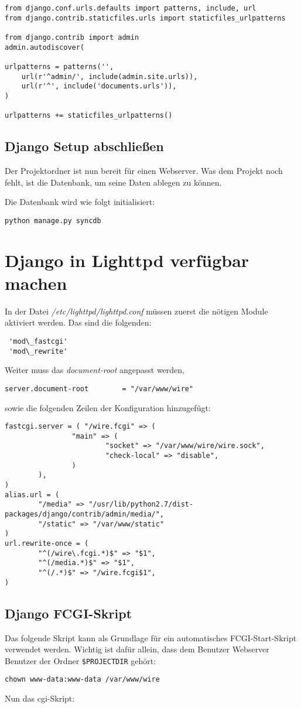 \begin{lstlisting}
from django.conf.urls.defaults import patterns, include, url
from django.contrib.staticfiles.urls import staticfiles_urlpatterns

from django.contrib import admin
admin.autodiscover(

urlpatterns = patterns('',
    url(r'^admin/', include(admin.site.urls)),
    url(r'^', include('documents.urls')),
)

urlpatterns += staticfiles_urlpatterns()
\end{lstlisting}

 \subsection{Django Setup abschließen}
 Der Projektordner ist nun bereit für einen Webserver. Was dem Projekt noch
 fehlt, ist die Datenbank, um seine Daten ablegen zu können.

 Die Datenbank wird wie folgt initialisiert:
\begin{lstlisting}
python manage.py syncdb
\end{lstlisting}

\section{Django in Lighttpd verfügbar machen}
In der Datei \emph{/etc/lighttpd/lighttpd.conf} müssen zuerst die nötigen
Module aktiviert werden. Das sind die folgenden:
\begin{lstlisting}
 'mod\_fastcgi'
 'mod\_rewrite'
\end{lstlisting}

Weiter muss das \emph{document-root} angepasst werden,
\begin{lstlisting}
server.document-root        = "/var/www/wire"
\end{lstlisting}
sowie die folgenden Zeilen der Konfiguration hinzugefügt:
\begin{lstlisting}
fastcgi.server = ( "/wire.fcgi" => (
                "main" => (
                        "socket" => "/var/www/wire/wire.sock",
                        "check-local" => "disable",
                )
        ),
)
alias.url = (
        "/media" => "/usr/lib/python2.7/dist-packages/django/contrib/admin/media/",
        "/static" => "/var/www/static"
)
url.rewrite-once = (
        "^(/wire\.fcgi.*)$" => "$1",
        "^(/media.*)$" => "$1",
        "^(/.*)$" => "/wire.fcgi$1",
)
\end{lstlisting}

 \subsection{Django FCGI-Skript}
Das folgende Skript kann als Grundlage für ein automatisches FCGI-Start-Skript
verwendet werden. Wichtig ist dafür allein, dass dem Benutzer Webserver
Benutzer der Ordner
\lstinline{$PROJECTDIR} gehört:
\begin{lstlisting}
chown www-data:www-data /var/www/wire
\end{lstlisting}

Nun das \Gls{cgi}-Skript:


